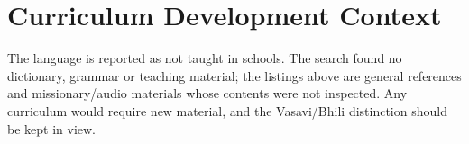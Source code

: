 \documentclass[12pt]{article}
\begin{document}
\section{Curriculum Development Context}
The language is reported as not taught in schools. The search found no dictionary, grammar or teaching material; the listings above are general references and missionary/audio materials whose contents were not inspected. Any curriculum would require new material, and the Vasavi/Bhili distinction should be kept in view.
\end{document}
